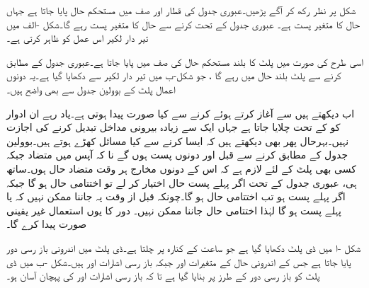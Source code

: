 شکل    پر نظر رکھ کر آگے پڑھیں۔عبوری جدول کی  قطار اور  صف میں مستحکم حال پایا جاتا ہے جہاں حال کا متغیر پست  ہے۔ عبوری جدول کے تحت  کرنے سے حال کا متغیر پست رہے گا۔شکل -الف میں تیر دار لکیر اس عمل کو ظاہر کرتی ہے۔

اسی طرح  کی صورت میں پلٹ کا  بلند مستحکم حال  کی صف میں پایا جاتا ہے۔عبوری جدول کے مطابق  کرنے سے پلٹ بلند حال میں رہے گا  ، جو شکل-ب   میں تیر دار لکیر سے دکھایا گیا ہے۔یہ دونوں اعمال پلٹ کے بوولین جدول سے بھی واضح ہیں۔

اب دیکھتے ہیں  سے آغاز کرتے ہوئے  کرنے سے کیا صورت پیدا ہوتی ہے۔یاد رہے ان ادوار کو کے تحت چلایا جاتا ہے جہاں ایک سے زیادہ بیرونی مداخل تبدیل کرنے کی اجازت نہیں۔بہرحال پھر بھی دیکھتے ہیں کہ ایسا کرنے سے کیا مسائل کھڑے ہوتے ہیں۔بوولین جدول کے مطابق کرنے سے قبل  اور  دونوں پست ہوں گے نا کہ آپس میں متضاد جبکہ کسی بھی پلٹ کے لئے لازم ہے کہ اس کے دونوں مخارج ہر وقت متضاد حال ہوں۔ساتھ ہی، عبوری جدول کے تحت اگر پہلے پست حال اختیار کر لے تو اختتامی حال  ہو گا جبکہ اگر  پہلے پست ہو تب اختتامی حال  ہو گا۔چونکہ قبل از وقت یہ جاننا ممکن نہیں کہ  یا  پہلے پست ہو گا لہٰذا اختتامی حال جاننا ممکن نہیں۔ دور کا یوں استعمال غیر یقینی صورت پیدا کرے گا۔


شکل   -ا میں   ڈی پلٹ دکھایا گیا ہے جو ساعت کے کنارہ پر چلتا ہے۔ڈی پلٹ میں اندرونی باز رسی دور پایا جاتا ہے جس کے اندرونی حال کے متغیرات  اور  جبکہ باز رسی اشارات  اور  ہیں۔شکل -ب میں ڈی پلٹ کو باز رسی دور کے طرز پر بنایا گیا ہے تا کہ باز رسی اشارات  اور  کی پہچان آسان ہو۔

